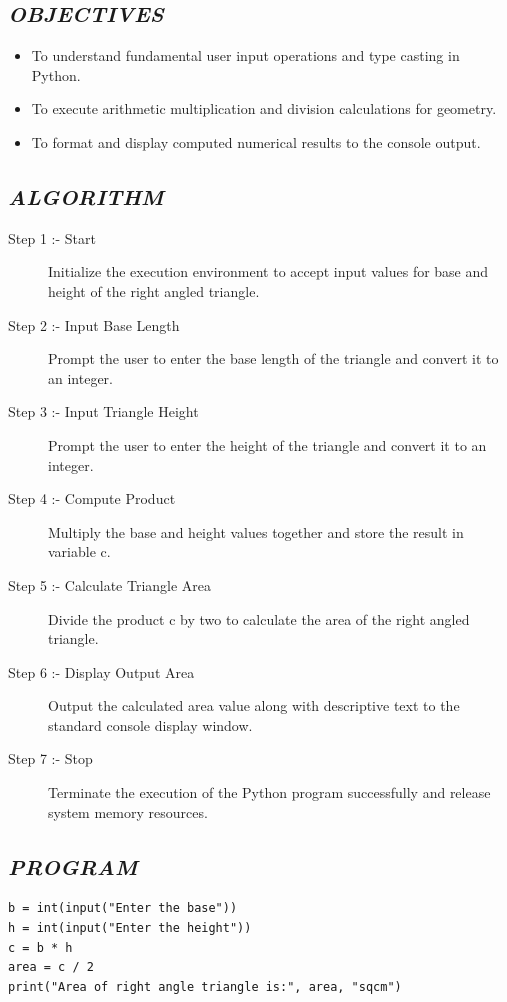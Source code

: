 \documentclass[11pt,a4paper]{article}
\begin{document}
\subsection*{\textit{OBJECTIVES}}
\begin{itemize}
  \item To understand fundamental user input operations and type casting in Python.
  \item To execute arithmetic multiplication and division calculations for geometry.
  \item To format and display computed numerical results to the console output.
\end{itemize}

\subsection*{\textit{ALGORITHM}}
\begin{description}
  \item[Step 1 :- Start] Initialize the execution environment to accept input values for base and height of the right angled triangle.
  \item[Step 2 :- Input Base Length] Prompt the user to enter the base length of the triangle and convert it to an integer.
  \item[Step 3 :- Input Triangle Height] Prompt the user to enter the height of the triangle and convert it to an integer.
  \item[Step 4 :- Compute Product] Multiply the base and height values together and store the result in variable c.
  \item[Step 5 :- Calculate Triangle Area] Divide the product c by two to calculate the area of the right angled triangle.
  \item[Step 6 :- Display Output Area] Output the calculated area value along with descriptive text to the standard console display window.
  \item[Step 7 :- Stop] Terminate the execution of the Python program successfully and release system memory resources.
\end{description}

\subsection*{\textit{PROGRAM}}
\begin{lstlisting}[style=pythonstyle]
b = int(input("Enter the base")) 
h = int(input("Enter the height")) 
c = b * h 
area = c / 2 
print("Area of right angle triangle is:", area, "sqcm")
\end{lstlisting}
\end{document}
